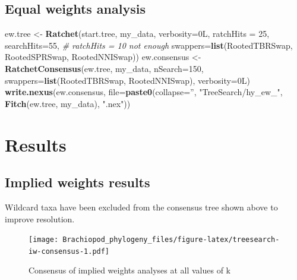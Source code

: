 \documentclass[]{book}
\newenvironment{Shaded}{\begin{snugshade}}{\end{snugshade}}
\newcommand{\KeywordTok}[1]{\textcolor[rgb]{0.13,0.29,0.53}{\textbf{#1}}}
\newcommand{\DataTypeTok}[1]{\textcolor[rgb]{0.13,0.29,0.53}{#1}}
\newcommand{\DecValTok}[1]{\textcolor[rgb]{0.00,0.00,0.81}{#1}}
\newcommand{\StringTok}[1]{\textcolor[rgb]{0.31,0.60,0.02}{#1}}
\newcommand{\CommentTok}[1]{\textcolor[rgb]{0.56,0.35,0.01}{\textit{#1}}}
\newcommand{\NormalTok}[1]{#1}
\theoremstyle{definition}
\theoremstyle{definition}
\theoremstyle{definition}
\theoremstyle{remark}
\begin{document}
\hypertarget{equal-weights-analysis}{%
\subsection{Equal weights analysis}\label{equal-weights-analysis}}

\begin{Shaded}
\begin{Highlighting}[]
\NormalTok{ew.tree <-}\StringTok{ }\KeywordTok{Ratchet}\NormalTok{(start.tree, my_data, }\DataTypeTok{verbosity=}\NormalTok{0L,}
                   \DataTypeTok{ratchHits =} \DecValTok{25}\NormalTok{, }\DataTypeTok{searchHits=}\DecValTok{55}\NormalTok{, }\CommentTok{# ratchHits = 10 not enough}
                   \DataTypeTok{swappers=}\KeywordTok{list}\NormalTok{(RootedTBRSwap, RootedSPRSwap, RootedNNISwap))}
\NormalTok{ew.consensus <-}\StringTok{ }\KeywordTok{RatchetConsensus}\NormalTok{(ew.tree, my_data, }\DataTypeTok{nSearch=}\DecValTok{150}\NormalTok{,}
                                 \DataTypeTok{swappers=}\KeywordTok{list}\NormalTok{(RootedTBRSwap, RootedNNISwap),}
                                 \DataTypeTok{verbosity=}\NormalTok{0L)}
\KeywordTok{write.nexus}\NormalTok{(ew.consensus, }\DataTypeTok{file=}\KeywordTok{paste0}\NormalTok{(}\DataTypeTok{collapse=}\StringTok{''}\NormalTok{, }\StringTok{"TreeSearch/hy_ew_"}\NormalTok{,}
                                      \KeywordTok{Fitch}\NormalTok{(ew.tree, my_data), }\StringTok{".nex"}\NormalTok{))}
\end{Highlighting}
\end{Shaded}

\hypertarget{results}{%
\section{Results}\label{results}}

\hypertarget{implied-weights-results}{%
\subsection{Implied weights results}\label{implied-weights-results}}

Wildcard taxa have been excluded from the consensus tree shown above to
improve resolution.

\begin{figure}
\centering
\texttt{[image: Brachiopod\_phylogeny\_files/figure-latex/treesearch-iw-consensus-1.pdf]}
\caption{\label{fig:treesearch-iw-consensus}Consensus of implied weights
analyses at all values of k}
\end{figure}
\end{document}
